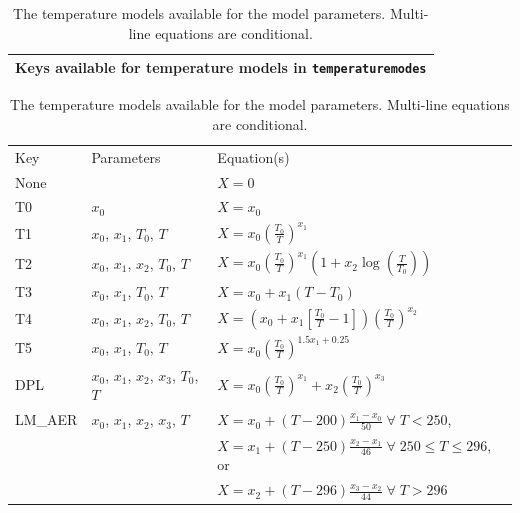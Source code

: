 \begin{table}[ht!]
 \centering
 \begin{tabular}{c}
  Keys available for temperature models in \verb|temperaturemodes|\\\hline
 \end{tabular}
 \begin{tabular}{lll}
  Key & Parameters & Equation(s)  \\[5pt]
  None&&$X=0$\\[5pt]
  T0 & $x_0$ & $X = x_0$ \\[5pt]
  T1 & $x_0$, $x_1$, $T_0$, $T$ & $X = x_0 \left(\frac{T_0}{T}\right)^{x_1}$ \\[5pt]
  T2 & $x_0$, $x_1$, $x_2$, $T_0$, $T$ & $X = x_0\left(\frac{T_0}{T}\right)^{x_1} \left(1 + x_2\log\left(\frac{T}{T_0}\right) \right) $ \\[5pt]
  T3 & $x_0$, $x_1$, $T_0$, $T$ & $X = x_0 + x_1\left(T - T_0\right) $ \\[5pt]
  T4 & $x_0$, $x_1$, $x_2$, $T_0$, $T$ & $X = \left(x_0 + x_1\left[\frac{T_0}{T} - 1\right]\right) \left(\frac{T_0}{T}\right)^{x_2} $ \\[5pt]
  T5 & $x_0$, $x_1$, $T_0$, $T$ & $X = x_0 \left(\frac{T_0}{T}\right)^{1.5x_1+0.25}$ \\[5pt]
  DPL & $x_0$, $x_1$, $x_2$, $x_3$, $T_0$, $T$ & $X = x_0 \left(\frac{T_0}{T}\right)^{x_1} + x_2 \left(\frac{T_0}{T}\right)^{x_3}$ \\[5pt]
  LM\_AER & $x_0$, $x_1$, $x_2$, $x_3$, $T$ & $X = x_0 + (T-200)\frac{x_1-x_0}{50}\;\forall\;T<250$, \\[5pt]
  &&$X=x_1 + (T-250)\frac{x_2-x_1}{46}\;\forall\; 250\leq T\leq296$, or\\[5pt]
  &&$X=x_2 + (T-296)\frac{x_3-x_2}{44}\;\forall \;T>296$\\[5pt]
 \end{tabular}
 \caption{The temperature models available for the model parameters. Multi-line equations
 are conditional.}
 \label{tab:abs_theory:lineshape:temperaturemodes}
\end{table}

